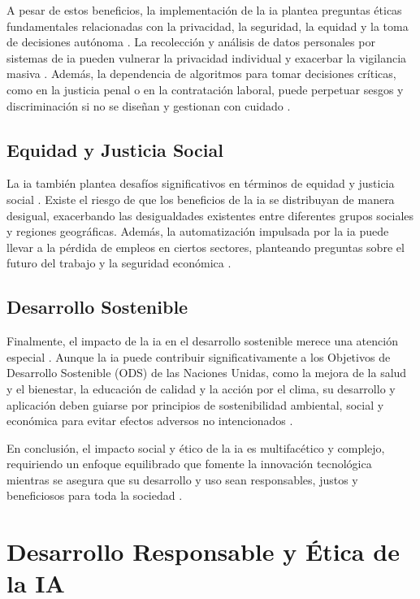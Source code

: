 A pesar de estos beneficios, la implementación de la \acrshort{ia} plantea preguntas éticas fundamentales relacionadas con la privacidad, la seguridad, la equidad y la toma de decisiones autónoma \cite{Martinez2022}. La recolección y análisis de datos personales por sistemas de \acrshort{ia} pueden vulnerar la privacidad individual y exacerbar la vigilancia masiva \cite{Nguyen2020}. Además, la dependencia de \glspl{algoritmo} para tomar decisiones críticas, como en la justicia penal o en la contratación laboral, puede perpetuar sesgos y discriminación si no se diseñan y gestionan con cuidado \cite{Robinson2021}.

\subsection{Equidad y Justicia Social}

La \acrshort{ia} también plantea desafíos significativos en términos de equidad y justicia social \cite{Hernandez2023}. Existe el riesgo de que los beneficios de la \acrshort{ia} se distribuyan de manera desigual, exacerbando las desigualdades existentes entre diferentes grupos sociales y regiones geográficas. Además, la automatización impulsada por la \acrshort{ia} puede llevar a la pérdida de empleos en ciertos sectores, planteando preguntas sobre el futuro del trabajo y la seguridad económica \cite{Fisher2019}.

\subsection{Desarrollo Sostenible}

Finalmente, el impacto de la \acrshort{ia} en el desarrollo sostenible merece una atención especial \cite{Owen2022}. Aunque la \acrshort{ia} puede contribuir significativamente a los Objetivos de Desarrollo Sostenible (ODS) de las Naciones Unidas, como la mejora de la salud y el bienestar, la educación de calidad y la acción por el clima, su desarrollo y aplicación deben guiarse por principios de sostenibilidad ambiental, social y económica para evitar efectos adversos no intencionados \cite{Santos2020}.

En conclusión, el impacto social y ético de la \acrshort{ia} es multifacético y complejo, requiriendo un enfoque equilibrado que fomente la innovación tecnológica mientras se asegura que su desarrollo y uso sean responsables, justos y beneficiosos para toda la sociedad \cite{Williams2021}.

\section{Desarrollo Responsable y Ética de la IA}

